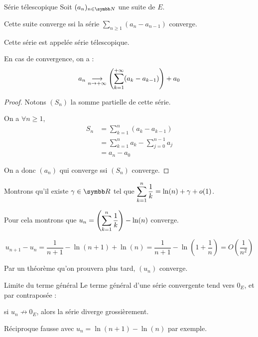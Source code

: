 \begin{theoreme}{Série télescopique}{}
    Soit $(a_n)_{n \in \N}$ une suite de $E$. 

    Cette suite converge ssi la série $\sum_{n \geqslant 1} (a_n - a_{n-1})$ converge.

    Cette série est appelée série télescopique. 

    En cas de convergence, on a : 
    \[a_n \underset{n \to + \infty}{\longrightarrow} \left( \sum_{k = 1 }^{+ \infty } (a_k - a_{k-1}) \right) + a_0\]
\end{theoreme}

\begin{proof}
    Notons $(S_n)$ la somme partielle de cette série. 

    On a $\forall n \geqslant 1$,
    \begin{align*}
        S_n & = \sum_{k=1}^n (a_k - a_{k-1}) \\
            & = \sum_{k=1}^n a_k - \sum_{j=0}^{n-1} a_j \\
            & = a_n - a_0
    \end{align*}

    On a donc $(a_n)$ qui converge ssi $(S_n)$ converge.
\end{proof}

\begin{exemple}
    Montrons qu'il existe $\gamma \in \R$ tel que $\displaystyle \sum_{k=1}^n \frac 1 k = \ln(n) + \gamma + o(1)$.
    
    Pour cela montrons que $\displaystyle u_n = \left(\sum^n_{k=1} \frac 1 k\right) - \ln(n)$ converge.

    \[u_{n+1} - u_n = \frac 1 {n+1} - \ln(n+1) + \ln(n) = \frac 1 {n+1} - \ln\left(1 + \frac 1 n\right) = O\left(\frac 1 {n^2}\right)\]
    
    Par un théorème qu'on prouvera plus tard, $(u_n)$ converge.
\end{exemple}

\begin{theoreme}{Limite du terme général}{}
    Le terme général d'une série convergente tend vers $0_E$, et par contraposée :
    \begin{center}
    si $u_n \not \longrightarrow 0_E$, alors la série diverge grossièrement.
    \end{center}
\end{theoreme}

\begin{remarque}
    Réciproque fausse avec $u_n = \ln(n + 1) - \ln(n)$ par exemple. 
\end{remarque}

